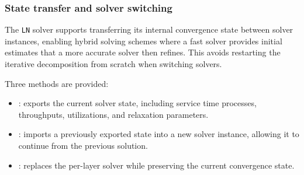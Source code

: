 \subsubsection{State transfer and solver switching}
The \texttt{LN} solver supports transferring its internal convergence state between solver instances, enabling hybrid solving schemes where a fast solver provides initial estimates that a more accurate solver then refines. This avoids restarting the iterative decomposition from scratch when switching solvers.

Three methods are provided:
\begin{itemize}
\item {}: exports the current solver state, including service time processes, throughputs, utilizations, and relaxation parameters.
\item {}: imports a previously exported state into a new solver instance, allowing it to continue from the previous solution.
\item {}: replaces the per-layer solver while preserving the current convergence state.
\end{itemize}

